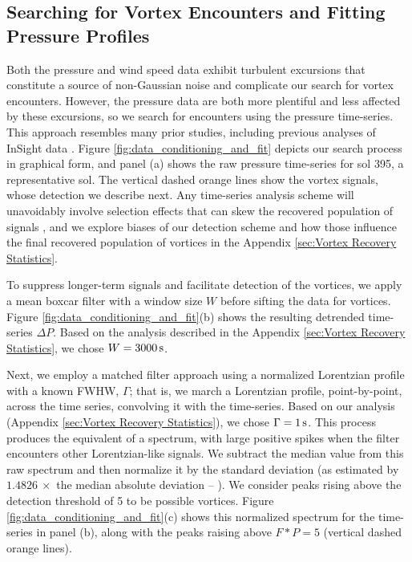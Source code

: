 \documentclass{aastex63}
\begin{document}
\subsection{Searching for Vortex Encounters and Fitting Pressure Profiles}
\label{sec:Searching for Vortex Encounters and Fitting Pressure Profiles}
Both the pressure and wind speed data exhibit turbulent excursions that constitute a source of non-Gaussian noise and complicate our search for vortex encounters. However, the pressure data are both more plentiful and less affected by these excursions, so we search for encounters using the pressure time-series. This approach resembles many prior studies, including previous analyses of InSight data \citep{Spiga2021, 2021Icar..35514119L}. Figure \ref{fig:data_conditioning_and_fit} depicts our search process in graphical form, and panel (a) shows the raw pressure time-series for sol 395, a representative sol. The vertical dashed orange lines show the vortex signals, whose detection we describe next. Any time-series analysis scheme will unavoidably involve selection effects that can skew the recovered population of signals \citep{2018Icar..299..166J}, and we explore biases of our detection scheme and how those influence the final recovered population of vortices in the Appendix \ref{sec:Vortex Recovery Statistics}. 

To suppress longer-term signals and facilitate detection of the vortices, we apply a mean boxcar filter with a window size $W$ before sifting the data for vortices. Figure \ref{fig:data_conditioning_and_fit}(b) shows the resulting detrended time-series $\Delta P$. Based on the analysis described in the Appendix \ref{sec:Vortex Recovery Statistics}, we chose $W = 3000\,{\rm s}$. 

Next, we employ a matched filter approach \citep[][ch.~13]{Press2007} using a normalized Lorentzian profile with a known FWHW, $\Gamma$; that is, we march a Lorentzian profile, point-by-point, across the time series, convolving it with the time-series. Based on our analysis (Appendix \ref{sec:Vortex Recovery Statistics}), we chose $\Gamma = 1\,{\rm s}$. This process produces the equivalent of a spectrum, with large positive spikes when the filter encounters other Lorentzian-like signals. We subtract the median value from this raw spectrum and then normalize it by the standard deviation (as estimated by $1.4826\ \times$ the median absolute deviation -- \citealp{doi:10.1080/01621459.1993.10476408}). We consider peaks rising above the detection threshold of 5 to be possible vortices. Figure \ref{fig:data_conditioning_and_fit}(c) shows this normalized spectrum for the time-series in panel (b), along with the peaks raising above $F \ast P = 5$ (vertical dashed orange lines). 
\end{document}
